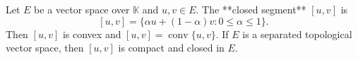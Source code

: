 Let $E$ be a vector space over $\mathbb{K}$ and $u, v \in E$. The **closed segment** $[u, v]$ is
$$[u, v] = \{\alpha u + (1 - \alpha)v : 0 \leq \alpha \leq 1\}.$$
Then $[u, v]$ is convex and $[u, v] = \operatorname{conv}\{u, v\}$. If $E$ is a separated topological vector space, then $[u, v]$ is compact and closed in $E$.
